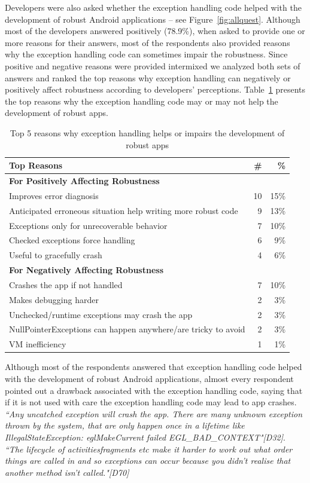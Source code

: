 \bigskip

Developers were also asked whether the exception handling code helped with the development of robust Android applications -- see Figure~\ref{fig:allquest}. Although most of the developers answered positively (78.9\%), when asked to provide one or more reasons for their answers, most of the respondents also provided reasons why the exception handling code can sometimes impair the robustness.  Since positive and negative reasons were provided intermixed we analyzed both sets of answers and ranked the top reasons why exception handling can negatively or positively affect robustness according to developers' perceptions. Table~\ref{tab:topreasons} presents the top reasons why the exception handling code may or may not help the development of robust apps. 

\begin{table}
\scriptsize
\centering
\begin{tabular}{lrr}
\hline
\bfseries{Top Reasons} & \bfseries{\#} & \bfseries{\%} \\
\hline
\bfseries{For Positively Affecting Robustness} &   &   \\
Improves error diagnosis  &	10	& 15\% \\
Anticipated erroneous situation help writing more robust code  & 9	 & 13\% \\ 
Exceptions only for unrecoverable behavior	& 7 &	10\% \\
Checked exceptions force handling  &	6	& 9\% \\
Useful to gracefully crash 	& 4 &	6\% \\
		
\bfseries{For Negatively Affecting Robustness} &   &   \\
Crashes the app if not handled	 & 7	& 10\% \\
Makes debugging harder &	2 &	3\% \\
Unchecked/runtime exceptions may crash the app & 2	& 3\% \\
NullPointerExceptions can happen anywhere/are tricky to avoid	 & 2	& 3\% \\
VM inefficiency 	& 1 & 1\% \\

\hline
\end{tabular}
\caption{Top 5 reasons why exception handling helps or impairs the development of robust apps}
\label{tab:topreasons}
\end{table}


Although most of the respondents answered that exception handling code helped with the development of robust Android applications, almost every respondent pointed out a drawback associated with the exception handling code, saying that if it is not used with care the exception handling code may lead to app crashes. \emph{``Any uncatched exception will crash the app. There are many unknown exception thrown by the system, that are only happen once in a lifetime like IllegalStateException: eglMakeCurrent failed EGL\_BAD\_CONTEXT"[D32]}. \emph{``The lifecycle of activities\/fragments etc make it harder to work out what order things are called in and so exceptions can occur because you didn't realise that another method isn't called."[D70]}

